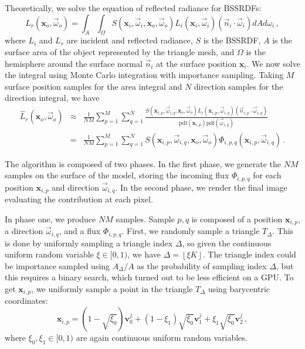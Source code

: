 \documentclass[10pt,a4paper]{article}
\begin{document}
Theoretically, we solve the equation of reflected radiance for BSSRDFs:
\begin{equation*}
L_r(\mathbf{x}_o, \vec{\omega}_o) = \int_A \int_\Omega S(\mathbf{x}_i, \vec{\omega}_i, \mathbf{x}_o, \vec{\omega}_o) L_i(\mathbf{x}_i, \vec{\omega}_i) (\vec{n}_i \cdot \vec{\omega}_i) d{A} d\omega_i \, ,
\end{equation*}
where $L_i$ and $L_r$ are incident and reflected radiance, $S$ is the BSSRDF, $A$ is the surface area of the object represented by the triangle mesh, and $\Omega$ is the hemisphere around the surface normal $\vec{n}_i$ at the surface position $\mathbf{x}_i$. We now solve the integral using Monte Carlo integration with importance sampling. Taking $M$ surface position samples for the area integral and $N$ direction samples for the direction integral, we have
\begin{eqnarray}
\hat{L}_r(\mathbf{x}_o, \vec{\omega}_o) &\approx& \frac{1}{NM} \sum_{p = 1}^M \sum_{q = 1}^N \frac{S(\mathbf{x}_{i,p}, \vec{\omega}_{i,q}, \mathbf{x}_o, \vec{\omega}_o) L_i(\mathbf{x}_{i,p}, \vec{\omega}_{i,q}) (\vec{n}_{i,p}\cdot \vec{\omega}_{i,q})}{\text{pdf}(\mathbf{x}_{i,p}) \text{pdf}(\vec{\omega}_{i,q})} \nonumber \\
&=& \frac{1}{NM} \sum_{p = 1}^M \sum_{q = 1}^N S(\mathbf{x}_{i,p}, \vec{\omega}_{i,q}, \mathbf{x}_o, \vec{\omega}_o) \Phi_{i,p,q}(\mathbf{x}_{i,p}, \vec{\omega}_{i,q}) \, . \label{eq:mc}
\end{eqnarray}

The algorithm is composed of two phases. In the first phase, we generate the $NM$ samples on the surface of the model, storing the incoming flux $\Phi_{i,p,q}$ for each position $\mathbf{x}_{i,p}$ and direction $\vec{\omega}_{i,q}$. In the second phase, we render the final image evaluating the contribution at each pixel.

In phase one, we produce $NM$ samples. Sample $p,q$ is composed of a position $\mathbf{x}_{i,p}$, a direction $\vec{\omega}_{i,q}$, and a flux $\Phi_{i,p,q}$. First, we randomly sample a triangle $T_\Delta$. This is done by uniformly sampling a triangle index $\Delta$, so given the continuous uniform random variable $\xi \in [0,1)$, we have $\Delta = \left \lfloor{\xi K}\right \rfloor$. The triangle index could be importance sampled using $A_\Delta/A$ as the probability of sampling index $\Delta$, but this requires a binary search, which turned out to be less efficient on a GPU. To get $\mathbf{x}_{i,p}$, we uniformly sample a point in the triangle $T_\Delta$ using barycentric coordinates:
\begin{equation*}
\mathbf{x}_{i,p} = (1 - \sqrt{\xi_0})\mathbf{v}^j_0 + (1 - {\xi_1})  \sqrt{\xi_0} \mathbf{v}^j_1 +  \xi_1\sqrt{\xi_0} \mathbf{v}^j_2 \, ,
\end{equation*}
where $\xi_0, \xi_1 \in [0,1)$ are again continuous uniform random variables.
\end{document}
